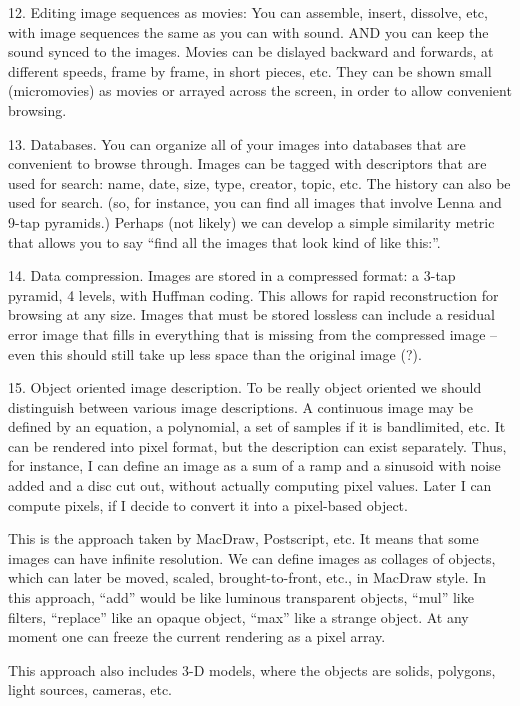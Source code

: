 12. Editing image sequences as movies:
	You can assemble, insert, dissolve, etc, with image
	sequences the same as you can with sound.  AND you can
	keep the sound synced to the images.
	Movies can be dislayed backward and forwards, at different
	speeds, frame by frame, in short pieces, etc.  They can
	be shown small (micromovies) as movies or arrayed across
	the screen, in order to allow convenient browsing.

13. Databases.
	You can organize all of your images into databases that are
	convenient to browse through.  Images can be tagged with
	descriptors that are used for search: name, date, size, type,
	creator, topic, etc.  The history can also be used for search.
	(so, for instance, you can find all images that involve Lenna
	and 9-tap pyramids.) Perhaps (not likely) we can develop a
	simple similarity metric that allows you to say ``find all the
	images that look kind of like this:''.

14. Data compression.
	Images are stored in a compressed format: a 3-tap pyramid, 4 levels,
	with Huffman coding.  This allows for rapid reconstruction for
	browsing at any size.  Images that must be stored lossless
	can include a residual error image that fills in everything
	that is missing from the compressed image -- even this should
	still take up less space than the original image (?).

15. Object oriented image description.
	To be really object oriented we should distinguish between various
	image descriptions.  A continuous image may be defined by an
	equation, a polynomial, a set of samples if it is bandlimited,
	etc.  It can be rendered into pixel format, but the description
	can exist separately.  Thus, for instance, I can define an image
	as a sum of a ramp and a sinusoid with noise added and a disc
	cut out, without actually computing pixel values.  Later I can
	compute pixels, if I decide to convert it into a pixel-based object.

	This is the approach taken by MacDraw, Postscript, etc.
	It means that some images can have infinite resolution.
  	We can define images as collages of objects, 
	which can later be moved,
	scaled, brought-to-front, etc.,	in MacDraw style.  In this
	approach, ``add'' would be like luminous transparent objects, ``mul''
	like filters, ``replace'' like an opaque object, ``max'' like a
	strange object.  At any moment one can freeze the current rendering as
	a pixel array.

	This approach also includes 3-D models, where the objects are
	solids, polygons, light sources, cameras, etc.

